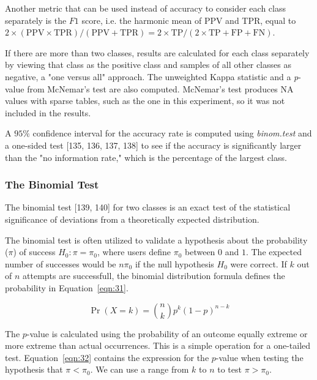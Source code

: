 \documentclass[preprint,12pt]{elsarticle}
\begin{document}
Another metric that can be used instead of accuracy to consider each class separately is the $F1$ score, i.e. the harmonic mean of PPV and TPR, equal to $2 \times (\mathrm{PPV} \times \mathrm{TPR}) / (\mathrm{PPV} + \mathrm{TPR}) = 2 \times \mathrm{TP} / (2 \times \mathrm{TP} + \mathrm{FP} + \mathrm{FN})$.

If there are more than two classes, results are calculated for each class separately by viewing that class as the positive class and samples of all other classes as negative, a "one versus all" approach.
The unweighted Kappa statistic and a \textit{p}-value from McNemar's test are also computed. McNemar's test produces NA values with sparse tables, such as the one in this experiment, so it was not included in the results.

A $95\%$ confidence interval for the accuracy rate is computed using \textit{binom.test} and a one-sided test [135, 136, 137, 138] to see if the accuracy is significantly larger than the "no information rate," which is the percentage of the largest class.

\subsubsection{The Binomial Test}

The binomial test [139, 140] for two classes is an exact test of the statistical significance of deviations from a theoretically expected distribution.

The binomial test is often utilized to validate a hypothesis about the probability ($\pi$) of success 
$H_{0}\colon \pi =\pi_{0}$, where users define $\pi_{0}$ between $0$ and $1$. The expected number of successes would be $n\pi_{0}$ if the null hypothesis $H_{0}$ were correct. If $k$ out of $n$ attempts are successfull, the binomial distribution formula defines the probability in Equation~\ref{eqn:31}.

\begin{equation}
	\Pr(X=k)={\binom{n}{k}}p^{k}(1-p)^{n-k}
	\label{eqn:31}
\end{equation}

The $p$-value is calculated using the probability of an outcome equally extreme or more extreme than actual occurrences. This is a simple operation for a one-tailed test. Equation~\ref{eqn:32} contains the expression for the $p$-value when testing the hypothesis that $\pi <\pi_{0}$. We can use a range from $k$ to $n$ to test $\pi >\pi_{0}$.
\end{document}
